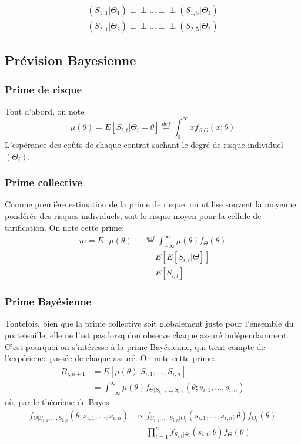 $$ \begin{aligned} (S_{1,1}|\Theta_1) {\perp\!\!\!\perp}...{\perp\!\!\!\perp} (S_{1,5}|\Theta_1) \\ 
(S_{2,1}|\Theta_2) {\perp\!\!\!\perp}...{\perp\!\!\!\perp} (S_{2,5}|\Theta_2)\end{aligned}$$

\subsection{Prévision Bayesienne}

\subsubsection{Prime de risque } 

Tout d'abord, on note
$$\boxed{\mu(\theta) = E[S_{i,t}|\Theta_i=\theta] \overset{def}{=} \int_0^{\infty} x f_{S|\Theta}(x;\theta)} $$
L'espérance des coûts de chaque contrat sachant le degré de risque individuel $(\Theta_i)$.

\subsubsection{Prime collective } 

Comme première estimation de la prime de risque, on utilise souvent la moyenne pondérée des risques individuels, soit le risque moyen pour la cellule de tarification. On note cette prime:
$$ \boxed{\begin{aligned}
m = E[\mu(\theta)] &\overset{def}{=} \int_{-\infty}^{\infty} \mu(\theta) f_{\Theta}(\theta) \\
 &= E[E[S_{i,t}|\Theta]] \\
 &= E[S_{i,t}] 
 \end{aligned}}$$

\subsubsection{Prime Bayésienne } 

Toutefois, bien que la prime collective soit globalement juste pour l'ensemble du portefeuille, elle ne l'est pas lorsqu'on observe chaque assuré indépendamment. C'est pourquoi on s'intéresse à la prime Bayésienne, qui tient compte de l'expérience passée de chaque assuré. On note cette prime:
$$ \boxed{\begin{aligned} 
B_{i,n+1}&=E[\mu(\theta)|S_{i,1},...,S_{i,n}] \\
&= \int_{-\infty}^{\infty} \mu(\theta)  f_{\Theta|S_{i,1},...,S_{i,n}}(\theta;s_{i,1},...,s_{i,n}) \end{aligned}}$$
où, par le théorème de Bayes
$$\begin{aligned} 
f_{\Theta|S_{i,1},...,S_{i,n}}(\theta;s_{i,1},...,s_{i,n}) &\propto f_{S_{i,1},...,S_{i,n}|\Theta_i}(s_{i,1},...,s_{i,n};\theta) f_{\Theta_i}(\theta) \\
&= \prod_{t=1}^n f_{S_{i,t}|\Theta_i}(s_{i,t};\theta)f_{\Theta}(\theta) 
\end{aligned}$$

